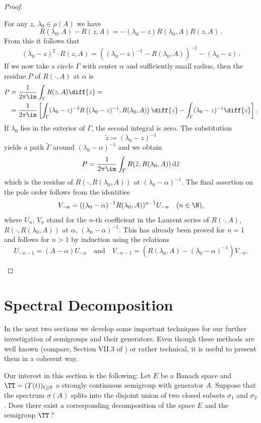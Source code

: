 \begin{proof}
\begin{enumerate}[\upshape (i), wide, labelindent=.25em]
For any $z$,  $\lambda_{0} \in \rho(A)$ we have 
%
\[
R(\lambda_{0},A) - R(z,A)= -(\lambda_{0}-z)R(\lambda_{0},A)R(z,A)\,.
\]
%
From this it follows that 
%
\[
	(\lambda_{0}-z)^2\cdot R(z,A) = \left((\lambda_{0}-z)^{-1}-R(\lambda_{0},A)\right)^{-1} - (\lambda_{0}-z)\,.
\]
%
If we now take a circle $\Gamma$ with center $\alpha$ and sufficiently small radius, then the residue $P$ of\/ $R(\cdot,A)$ at $\alpha$ is
\begin{align*}
P &=  \frac{1}{2\pi\im } \int_{\Gamma} R(z,A)   \diff{z} = \\
&=  \frac{1}{2\pi\im } \left[\int_{\Gamma} (\lambda_{0}-z)^{-2}R\left((\lambda_{0}-z)^{-1}, R(\lambda_{0},A)\right)  \diff{z}   - 
   \int_{\Gamma}(\lambda_{0}-z)^{-1} \diff{z} \right] . 
\end{align*}
If\/ $\lambda_{0}$ lies in the exterior of\/ $\Gamma$, the second integral is zero.
The substitution 
%
\[
	 \tilde{z} \coloneqq (\lambda_{0} - z)^{-1} 
\]
%
yields a path $\tilde{\Gamma}$ around $(\lambda_{0}-\alpha)^{-1}$ and we obtain
\[
P = \frac{1}{2\pi\im } \int_{\tilde{\Gamma}} R(\tilde{z},R(\lambda_{0},A)) \, \mathrm{d}\tilde{z}
\]
which is the residue of\/ $R(\cdot,R(\lambda_{0},A))$ at $(\lambda_{0}-\alpha)^{-1}$.
The final assertion on the pole order follows from the identities
\[
V_{-n} = ((\lambda_{0}-\alpha)^{-1}R(\lambda_{0},A))^{n-1}U_{-n} \quad (n \in \N) ,
\]
where $U_{n}$, \resp $V_{n}$ stand for the $ n $-th coefficient in the Laurent series of\/ $R(\cdot,A)$, \resp $R(\cdot,R(\lambda_{0},A))$ at $\alpha$, \resp $(\lambda_{0}-\alpha)^{-1}$.
This has already been proved for $n = 1$ and follows for $n > 1$ by induction using the relations
\[
U_{-n-1} = (A - \alpha)U_{-n} 
\quad \text{and} \quad 
V_{-n-1} = \left(R(\lambda_{0},A) - (\lambda_{0}-\alpha)^{-1}\right)V_{-n} .
\]
\end{enumerate}
\end{proof}
\section{Spectral Decomposition}\label{sec:a3-3}%
In the next two sections we develop some important techniques for our further investigation of semigroups and their generators.
Even though these methods are well known (compare, \eg Section VII.3 of \textcite{dunfordschwartz:1958}) or rather technical, it is useful to present them in a coherent way.

Our interest in this section is the following: Let $E$ be a Banach space and $\TT = (T(t))_{t \geq 0}$ a strongly continuous semigroup with generator $A$.
Suppose that the spectrum $\sigma(A)$ splits into the disjoint union of two closed subsets $\sigma_{1}$ and $\sigma_{2}$.
Does there exist a corresponding decomposition of the space $E$ and the semigroup $\TT$\,?

